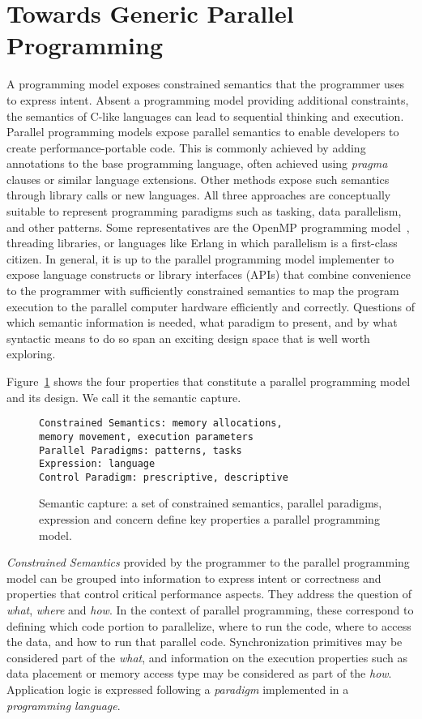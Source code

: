 \section{Towards Generic Parallel Programming}\label{chap:background}

A programming model exposes constrained semantics that the programmer uses to express intent. Absent a programming model providing additional constraints, the semantics of C-like languages can lead to sequential thinking and execution. Parallel programming models expose parallel semantics to enable developers to create performance-portable code. This is commonly achieved by adding annotations to the base programming language, often achieved using \emph{pragma} clauses or similar language extensions. Other methods expose such semantics through library calls or new languages. All three approaches are conceptually suitable to represent programming paradigms such as tasking, data parallelism, and other patterns. Some representatives are the OpenMP programming model~\cite{OPENMP}, threading libraries, or languages like Erlang\cite{ERLANG} in which parallelism is a first-class citizen. In general, it is up to the parallel programming model implementer to expose language constructs or library interfaces (APIs) that combine convenience to the programmer with sufficiently constrained semantics to map the program execution to the parallel computer hardware efficiently and correctly. Questions of which semantic information is needed, what paradigm to present, and by what syntactic means to do so span an exciting design space that is well worth exploring.

 Figure~\ref{figSemCapture} shows the four properties that constitute a parallel programming model and its design. We call it the semantic capture.

\begin{figure}[h]
\begin{verbatim}
Constrained Semantics: memory allocations, 
memory movement, execution parameters
Parallel Paradigms: patterns, tasks
Expression: language 
Control Paradigm: prescriptive, descriptive
\end{verbatim}
\caption{Semantic capture: a set of constrained semantics, parallel paradigms, expression and concern define key properties a parallel programming model.}
\label{figSemCapture}
\end{figure}

\emph{Constrained Semantics} provided by the programmer to the parallel programming model can be grouped into information to express intent or correctness and properties that control critical performance aspects. They address the question of \emph{what}, \emph{where} and \emph{how}. In the context of parallel programming, these correspond to defining which code portion to parallelize, where to run the code, where to access the data, and how to run that parallel code. Synchronization primitives may be considered part of the \emph{what}, and information on the execution properties such as data placement or memory access type may be considered as part of the \emph{how}. Application logic is expressed following a \emph{paradigm} implemented in a \emph{programming language}.

